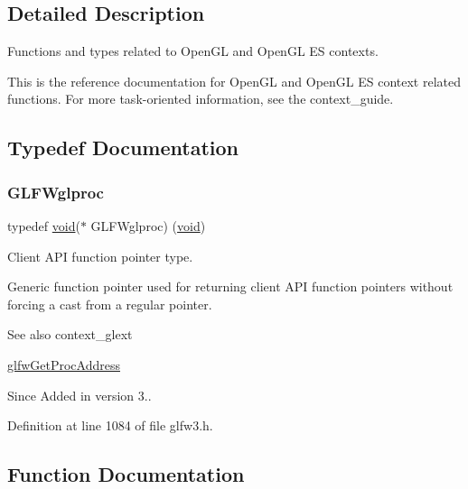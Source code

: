 \subsection{Detailed Description}
Functions and types related to Open\+GL and Open\+GL ES contexts. 

This is the reference documentation for Open\+GL and Open\+GL ES context related functions. For more task-\/oriented information, see the context\+\_\+guide. 

\subsection{Typedef Documentation}
\mbox{\label{group__context_ga3d47c2d2fbe0be9c505d0e04e91a133c}} 
\subsubsection{\texorpdfstring{GLFWglproc}{GLFWglproc}}
{\footnotesize\ttfamily typedef \mbox{\hyperlink{glad_8h_a950fc91edb4504f62f1c577bf4727c29}{void}}($\ast$ G\+L\+F\+Wglproc) (\mbox{\hyperlink{glad_8h_a950fc91edb4504f62f1c577bf4727c29}{void}})}



Client A\+PI function pointer type. 

Generic function pointer used for returning client A\+PI function pointers without forcing a cast from a regular pointer.

\begin{DoxySeeAlso}{See also}
context\+\_\+glext 

\mbox{\hyperlink{group__context_ga0e8af175218929615c16e74938c10f2a}{glfw\+Get\+Proc\+Address}}
\end{DoxySeeAlso}
\begin{DoxySince}{Since}
Added in version 3.. 
\end{DoxySince}


Definition at line 1084 of file glfw3.\+h.



\subsection{Function Documentation}
\mbox{\label{group__context_ga9a28c712d35f9e43534e1d03b051c04c}} 
